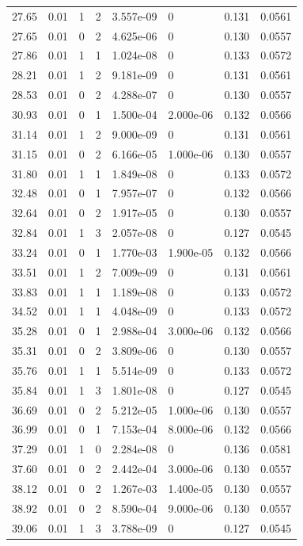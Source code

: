 \documentclass[preview]{standalone}
\begin{document}
{{{\begin{tabular}{L{1.2cm}C{1.2cm} C{0.3cm}C{0.5cm} C{1.4cm}C{1.4cm} C{1.4cm}C{1.4cm}}
  27.65  &  0.01  & 1     &  2 &  3.557e-09  & 0  & 0.131 &  0.0561   \\ 
  27.65  &  0.01  & 0     &  2 &  4.625e-06  & 0  & 0.130 &  0.0557   \\ 
  27.86  &  0.01  & 1     &  1 &  1.024e-08  & 0  & 0.133 &  0.0572   \\ 
  28.21  &  0.01  & 1     &  2 &  9.181e-09  & 0  & 0.131 &  0.0561   \\ 
  28.53  &  0.01  & 0     &  2 &  4.288e-07  & 0  & 0.130 &  0.0557   \\ 
  30.93  &  0.01  & 0     &  1 &  1.500e-04  & 2.000e-06  & 0.132 &  0.0566   \\ 
  31.14  &  0.01  & 1     &  2 &  9.000e-09  & 0  & 0.131 &  0.0561   \\ 
  31.15  &  0.01  & 0     &  2 &  6.166e-05  & 1.000e-06  & 0.130 &  0.0557   \\ 
  31.80  &  0.01  & 1     &  1 &  1.849e-08  & 0  & 0.133 &  0.0572   \\ 
  32.48  &  0.01  & 0     &  1 &  7.957e-07  & 0  & 0.132 &  0.0566   \\ 
  32.64  &  0.01  & 0     &  2 &  1.917e-05  & 0  & 0.130 &  0.0557   \\ 
  32.84  &  0.01  & 1     &  3 &  2.057e-08  & 0  & 0.127 &  0.0545   \\ 
  33.24  &  0.01  & 0     &  1 &  1.770e-03  & 1.900e-05  & 0.132 &  0.0566   \\ 
  33.51  &  0.01  & 1     &  2 &  7.009e-09  & 0  & 0.131 &  0.0561   \\ 
  33.83  &  0.01  & 1     &  1 &  1.189e-08  & 0  & 0.133 &  0.0572   \\ 
  34.52  &  0.01  & 1     &  1 &  4.048e-09  & 0  & 0.133 &  0.0572   \\ 
  35.28  &  0.01  & 0     &  1 &  2.988e-04  & 3.000e-06  & 0.132 &  0.0566   \\ 
  35.31  &  0.01  & 0     &  2 &  3.809e-06  & 0  & 0.130 &  0.0557   \\ 
  35.76  &  0.01  & 1     &  1 &  5.514e-09  & 0  & 0.133 &  0.0572   \\ 
  35.84  &  0.01  & 1     &  3 &  1.801e-08  & 0  & 0.127 &  0.0545   \\ 
  36.69  &  0.01  & 0     &  2 &  5.212e-05  & 1.000e-06  & 0.130 &  0.0557   \\ 
  36.99  &  0.01  & 0     &  1 &  7.153e-04  & 8.000e-06  & 0.132 &  0.0566   \\ 
  37.29  &  0.01  & 1     &  0 &  2.284e-08  & 0  & 0.136 &  0.0581   \\ 
  37.60  &  0.01  & 0     &  2 &  2.442e-04  & 3.000e-06  & 0.130 &  0.0557   \\ 
  38.12  &  0.01  & 0     &  2 &  1.267e-03  & 1.400e-05  & 0.130 &  0.0557   \\ 
  38.92  &  0.01  & 0     &  2 &  8.590e-04  & 9.000e-06  & 0.130 &  0.0557   \\ 
  39.06  &  0.01  & 1     &  3 &  3.788e-09  & 0  & 0.127 &  0.0545   \\ 
\hline 
\end{tabular} 

}}}
\end{document}
